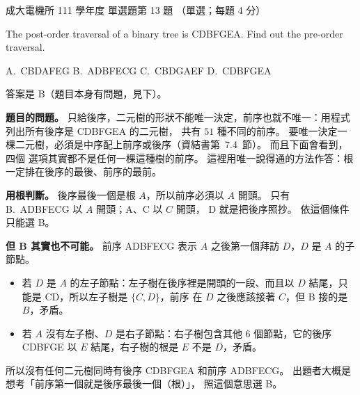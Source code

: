 \begin{pastexam}[label={px:ncku-111-ee-ds-13}]{成大電機所 111 學年度 單選題第 13 題}
（單選；每題 4 分）

The post-order traversal of a binary tree is CDBFGEA. Find out the pre-order traversal.

A.~CBDAFEG \qquad B.~ADBFECG \qquad C.~CBDGAEF \qquad D.~CDBFGEA
\end{pastexam}

\begin{pastsoln}
答案是 B（題目本身有問題，見下）。

\textbf{題目的問題。} 只給後序，二元樹的形狀不能唯一決定，前序也就不唯一：用程式列出所有後序是 CDBFGEA 的二元樹，
共有 $51$ 種不同的前序。 要唯一決定一棵二元樹，必須是中序配上前序或後序（資結書第~7.4~節）。 而且下面會看到，四個
選項其實都不是任何一棵這種樹的前序。 這裡用唯一說得通的方法作答：根一定排在後序的最後、前序的最前。

\textbf{用根判斷。} 後序最後一個是根 $A$，所以前序必須以 $A$ 開頭。 只有 B.~ADBFECG 以 $A$ 開頭；A、C 以 $C$ 開頭，
D 就是把後序照抄。 依這個條件只能選 B。

\textbf{但 B 其實也不可能。} 前序 ADBFECG 表示 $A$ 之後第一個拜訪 $D$，$D$ 是 $A$ 的子節點。
\begin{itemize}
\item 若 $D$ 是 $A$ 的左子節點：左子樹在後序裡是開頭的一段、而且以 $D$ 結尾，只能是 CD，所以左子樹是 $\{C, D\}$，前序
在 $D$ 之後應該接著 $C$，但 B 接的是 $B$，矛盾。
\item 若 $A$ 沒有左子樹、$D$ 是右子節點：右子樹包含其他 $6$ 個節點，它的後序 CDBFGE 以 $E$ 結尾，右子樹的根是 $E$
不是 $D$，矛盾。
\end{itemize}
所以沒有任何二元樹同時有後序 CDBFGEA 和前序 ADBFECG。 出題者大概是想考「前序第一個就是後序最後一個（根）」，
照這個意思選 B。
\end{pastsoln}
